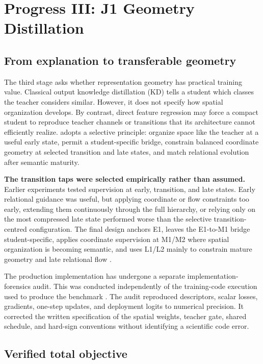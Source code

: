\section{Progress III: J1 Geometry Distillation}\label{sec:j1}

\subsection{From explanation to transferable geometry}

The third stage asks whether representation geometry has practical training
value. Classical output knowledge distillation (KD) tells a student which
classes the teacher considers similar. However, it does not specify how spatial
organization develops. By contrast, direct feature regression may force a compact student to reproduce
teacher channels or transitions that its architecture cannot efficiently
realize. \jmethod{} adopts a selective principle: organize space like the
teacher at a useful early state, permit a student-specific bridge, constrain
balanced coordinate geometry at selected transition and late states, and match
relational evolution after semantic maturity.

\textbf{The transition taps were selected empirically rather than assumed.}
Earlier experiments tested supervision at early, transition, and late states.
Early relational guidance was useful, but applying coordinate or flow
constraints too early, extending them continuously through the full hierarchy,
or relying only on the most compressed late state performed worse than the
selective transition-centred configuration. The final design anchors
E1, leaves the E1-to-M1 bridge student-specific, applies coordinate supervision
at M1/M2 where spatial organization is becoming semantic, and uses L1/L2 mainly
to constrain mature geometry and late relational flow \cite{chan2026j1}.

The production implementation has undergone a separate implementation-forensics
audit. This was conducted independently of the training-code execution used to
produce the benchmark \cite{chan2026j1}. The audit reproduced descriptors,
scalar losses, gradients, one-step updates, and deployment logits to numerical
precision. It corrected
the written specification of the spatial weights, teacher gate, shared
schedule, and hard-sign conventions without identifying a scientific code
error.

\subsection{Verified total objective}

